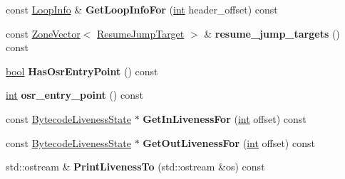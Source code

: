 \begin{DoxyCompactItemize}
const \mbox{\hyperlink{structv8_1_1internal_1_1compiler_1_1LoopInfo}{Loop\+Info}} \& {\bfseries Get\+Loop\+Info\+For} (\mbox{\hyperlink{classint}{int}} header\+\_\+offset) const
\item 
\mbox{\label{classv8_1_1internal_1_1compiler_1_1BytecodeAnalysis_aaac53bcb7acb02cf7b4fcabf90c5b1a2}} 
const \mbox{\hyperlink{classv8_1_1internal_1_1ZoneVector}{Zone\+Vector}}$<$ \mbox{\hyperlink{classv8_1_1internal_1_1compiler_1_1ResumeJumpTarget}{Resume\+Jump\+Target}} $>$ \& {\bfseries resume\+\_\+jump\+\_\+targets} () const
\item 
\mbox{\label{classv8_1_1internal_1_1compiler_1_1BytecodeAnalysis_a7eae68a4c85c4df839bc3e19b62a5ded}} 
\mbox{\hyperlink{classbool}{bool}} {\bfseries Has\+Osr\+Entry\+Point} () const
\item 
\mbox{\label{classv8_1_1internal_1_1compiler_1_1BytecodeAnalysis_a4c32d8fb1934b5374be02981cf40d043}} 
\mbox{\hyperlink{classint}{int}} {\bfseries osr\+\_\+entry\+\_\+point} () const
\item 
\mbox{\label{classv8_1_1internal_1_1compiler_1_1BytecodeAnalysis_a2d9d432342045dafdb545514938a5506}} 
const \mbox{\hyperlink{classv8_1_1internal_1_1compiler_1_1BytecodeLivenessState}{Bytecode\+Liveness\+State}} $\ast$ {\bfseries Get\+In\+Liveness\+For} (\mbox{\hyperlink{classint}{int}} offset) const
\item 
\mbox{\label{classv8_1_1internal_1_1compiler_1_1BytecodeAnalysis_a61b418ef9cb2a3abdb2f111eafe96730}} 
const \mbox{\hyperlink{classv8_1_1internal_1_1compiler_1_1BytecodeLivenessState}{Bytecode\+Liveness\+State}} $\ast$ {\bfseries Get\+Out\+Liveness\+For} (\mbox{\hyperlink{classint}{int}} offset) const
\item 
\mbox{\label{classv8_1_1internal_1_1compiler_1_1BytecodeAnalysis_a543dedab04ccec67ab334e8de37e7c7b}} 
std\+::ostream \& {\bfseries Print\+Liveness\+To} (std\+::ostream \&os) const
\end{DoxyCompactItemize}


